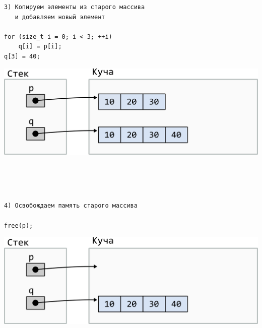\documentclass{article}
\begin{document}
\noindent\begin{minipage}{.45\textwidth}
\begin{lstlisting}
3) Копируем элементы из старого массива
   и добавляем новый элемент
   
for (size_t i = 0; i < 3; ++i)
    q[i] = p[i];
q[3] = 40;
\end{lstlisting}
\end{minipage}
\begin{minipage}{.45\textwidth}
\includegraphics[scale=0.75]{../images/malloc_realocation3.png}
\end{minipage}
\quad\\
\quad\\
\quad\\


\noindent\begin{minipage}{.45\textwidth}
\begin{lstlisting}
4) Освобождаем память старого массива

free(p);
\end{lstlisting}
\end{minipage}
\begin{minipage}{.45\textwidth}
\includegraphics[scale=0.75]{../images/malloc_realocation4.png}
\end{minipage}
\quad\\
\quad\\
\quad\\
\end{document}
